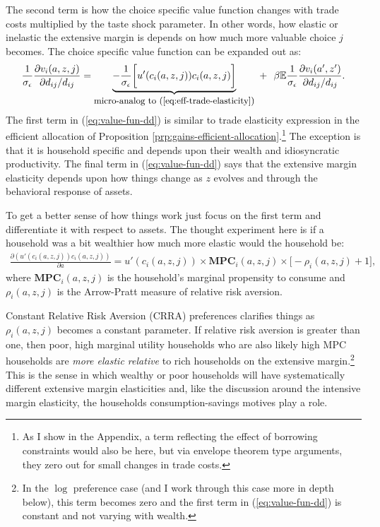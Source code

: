 \documentclass[12pt,pdftex]{article}
\begin{document}
\begin{onehalfspacing}
The second term is how the choice specific value function changes with trade costs multiplied by the taste shock parameter. In other words, how elastic or inelastic the extensive margin is depends on how much more valuable choice $j$ becomes. The choice specific value function can be expanded out as:
\begin{align}
\frac{1}{\sigma_{\epsilon}}\frac{\partial v_{i}(a,z,j)}{\partial d_{ij}/d_{ij}} = \underbrace{-\frac{1}{\sigma_{\epsilon}}\bigg[u'(c_{i}(a,z,j))c_{i}(a,z,j)\bigg]}_{\mbox{\small micro-analog to (\ref{eq:eff-trade-elasticity})}} \
+ \ \ \beta \mathbb{E}\frac{1}{\sigma_{\epsilon}}\frac{\partial v_{i}(a',z')}{\partial d_{ij}/ d_{ij}}. \label{eq:value-fun-dd}
\end{align}
The first term in (\ref{eq:value-fun-dd}) is similar to trade elasticity expression in the efficient allocation of Proposition \ref{prp:gains-efficient-allocation}.\footnote{\label{f-note:bc-elasticity}As I show in the Appendix, a term reflecting the effect of borrowing constraints would also be here, but via envelope theorem type arguments, they zero out for small changes in trade costs.} The exception is that it is household specific and depends upon their wealth and idiosyncratic productivity. The final term in (\ref{eq:value-fun-dd}) says that the extensive margin elasticity depends upon how things change as $z$ evolves and through the behavioral response of assets.

To get a better sense of how things work just focus on the first term and differentiate it with respect to assets. The thought experiment here is if a household was a bit wealthier how much more elastic would the household be:
\begin{align}
\frac{\partial (u'(c_{i}(a,z,j))c_{i}(a,z,j))}{\partial a} = u'(c_{i}(a,z,j))\times \mathbf{MPC}_{i}(a,z,j) \times \bigg[-\rho_{i}(a,z,j) + 1\bigg], \label{eq:elasticity-mpc}
\end{align}
where $\mathbf{MPC}_{i}(a,z,j)$ is the household's marginal propensity to consume and $\rho_{i}(a,z,j)$ is the Arrow-Pratt measure of relative risk aversion.

Constant Relative Risk Aversion (CRRA) preferences clarifies things as $\rho_{i}(a,z,j)$ becomes a constant parameter. If relative risk aversion is greater than one, then poor, high marginal utility households who are also likely high MPC households are \emph{more elastic relative} to rich households on the extensive margin.\footnote{In the $\log$ preference case (and I work through this case more in depth below), this term becomes zero and the first term in (\ref{eq:value-fun-dd}) is constant and not varying with wealth.} This is the sense in which wealthy or poor households will have systematically different extensive margin elasticities and, like the discussion around the intensive margin elasticity, the households consumption-savings motives play a role.


\end{onehalfspacing}
\end{document}
